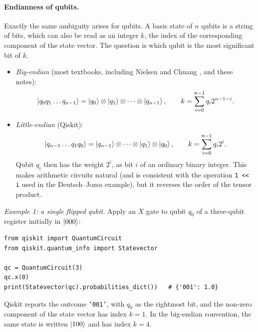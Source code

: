\paragraph{Endianness of qubits.} Exactly the same ambiguity arises for qubits. A basis state of $n$ qubits is a string of bits, which can also be read as an integer $k$, the index of the corresponding
component of the state vector. The question is which qubit is the most significant bit of $k$.
\begin{itemize}
  \item \emph{Big-endian} (most textbooks, including Nielsen and Chuang \cite{NielsenChuang}, and these notes):
  \begin{equation}
    \left|q_0q_1\dots q_{n-1}\right\rangle=\left|q_0\right\rangle\otimes\left|q_1\right\rangle\otimes\dots\otimes\left|q_{n-1}\right\rangle,\qquad k=\sum_{i=0}^{n-1}q_i2^{n-1-i}.
  \end{equation}
  \item \emph{Little-endian} (Qiskit):
  \begin{equation}
    \left|q_{n-1}\dots q_1q_0\right\rangle=\left|q_{n-1}\right\rangle\otimes\dots\otimes\left|q_1\right\rangle\otimes\left|q_0\right\rangle,\qquad k=\sum_{i=0}^{n-1}q_i2^i .
  \end{equation}
  Qubit $q_i$ then has the weight $2^i$, as bit $i$ of an ordinary binary integer. This makes arithmetic circuits natural (and is consistent with the operation \texttt{1 << i} used in the
  Deutsch--Jozsa example), but it reverses the order of the tensor product.
\end{itemize}
\emph{Example 1: a single flipped qubit.} Apply an $X$ gate to qubit $q_0$ of a three-qubit register initially in $\left|000\right\rangle$:
\begin{lstlisting}
from qiskit import QuantumCircuit
from qiskit.quantum_info import Statevector

qc = QuantumCircuit(3)
qc.x(0)
print(Statevector(qc).probabilities_dict())   # {'001': 1.0}
\end{lstlisting}
Qiskit reports the outcome \texttt{'001'}, with $q_0$ as the rightmost bit, and the non-zero component of the state vector has index $k=1$. In the big-endian convention, the same state is written
$\left|100\right\rangle$ and has index $k=4$.

